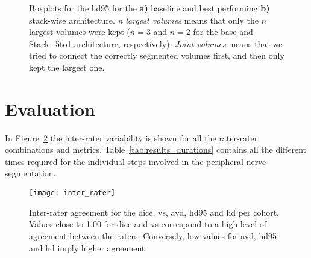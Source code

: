 \begin{figure}[htbp]
	\centering
	\hfill
	\caption[Post-processing impact on \acrlong{hd95}]{Boxplots for the \acrlong{hd95} for the \textbf{a)} baseline and best performing \textbf{b)} stack-wise architecture. \textit{n largest volumes} means that only the $n$ largest volumes were kept ($n = 3$ and $n = 2$ for the base and Stack\_5to1 architecture, respectively). \textit{Joint volumes} means that we tried to connect the correctly segmented volumes first, and then only kept the largest one.}
	\label{fig:pp_boxplots_hd95}  
\end{figure}





\section{Evaluation} \label{sec:exp_evaluation} %
In Figure~\ref{fig:res_inter_rater} the inter-rater variability is shown for all the rater-rater combinations and metrics. Table~\ref{tab:results_durations} contains all the different times required for the individual steps involved in the peripheral nerve segmentation.

\begin{figure}[htbp]	
	\texttt{[image: inter\_rater]}
    \caption[Inter-Rater Agreement]{Inter-rater agreement for the \acrlong{dice}, \acrlong{vs}, \acrlong{avd}, \acrlong{hd95} and \acrlong{hd} per cohort. Values close to 1.00 for \gls{dice} and \gls{vs} correspond to a high level of agreement between the raters. Conversely, low values for \gls{avd}, \gls{hd95} and \gls{hd} imply higher agreement.}
    \label{fig:res_inter_rater}
\end{figure}



